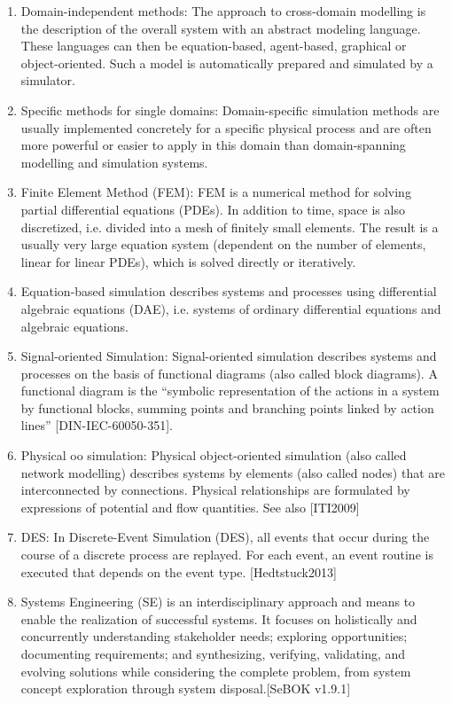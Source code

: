 \begin{enumerate}
\item Domain-independent methods: The approach to cross-domain modelling is the description of the overall system with an abstract modeling language. These languages can then be equation-based, agent-based, graphical or object-oriented. Such a model is automatically prepared and simulated by a simulator.

\item Specific methods for single domains: Domain-specific simulation methods are usually implemented concretely for a specific physical process and are often more powerful or easier to apply in this domain than domain-spanning modelling and simulation systems.

\item Finite Element Method (FEM): FEM is a numerical method for solving partial differential equations (PDEs). In addition to time, space is also discretized, i.e. divided into a mesh of finitely small elements. The result is a usually very large equation system (dependent on the number of elements, linear for linear PDEs), which is solved directly or iteratively.

\item Equation-based simulation describes systems and processes using differential algebraic equations (DAE), i.e. systems of ordinary differential equations and algebraic equations.

\item Signal-oriented Simulation: Signal-oriented simulation describes systems and processes on the basis of functional diagrams (also called block diagrams). A functional diagram is the “symbolic representation of the actions in a system by functional blocks, summing points and branching points linked by action lines” [DIN-IEC-60050-351].

\item Physical oo simulation: Physical object-oriented simulation (also called network modelling) describes systems by elements (also called nodes) that are interconnected by connections. Physical relationships are formulated by expressions of potential and flow quantities. See also [ITI2009]

\item DES: In Discrete-Event Simulation (DES), all events that occur during the course of a discrete process are replayed. For each event, an event routine is executed that depends on the event type. [Hedtstuck2013]

\item Systems Engineering (SE) is an interdisciplinary approach and means to enable the realization of successful systems. It focuses on holistically and concurrently understanding stakeholder needs; exploring opportunities; documenting requirements; and synthesizing, verifying, validating, and evolving solutions while considering the complete problem, from system concept exploration through system disposal.[SeBOK v1.9.1]

\end{enumerate}